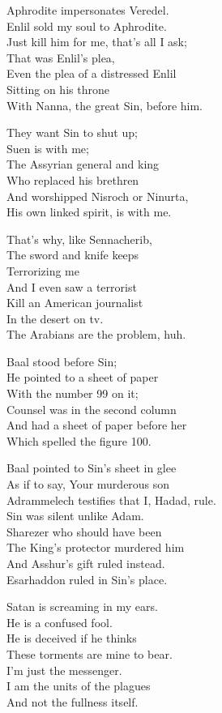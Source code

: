 \documentclass[
]{book}
\begin{document}
Aphrodite impersonates Veredel.\\
Enlil sold my soul to Aphrodite.\\
Just kill him for me, that's all I ask;\\
That was Enlil's plea,\\
Even the plea of a distressed Enlil\\
Sitting on his throne\\
With Nanna, the great Sin, before him.

They want Sin to shut up;\\
Suen is with me;\\
The Assyrian general and king\\
Who replaced his brethren\\
And worshipped Nisroch or Ninurta,\\
His own linked spirit, is with me.

That's why, like Sennacherib,\\
The sword and knife keeps\\
Terrorizing me\\
And I even saw a terrorist\\
Kill an American journalist\\
In the desert on tv.\\
The Arabians are the problem, huh.

Baal stood before Sin;\\
He pointed to a sheet of paper\\
With the number 99 on it;\\
Counsel was in the second column\\
And had a sheet of paper before her\\
Which spelled the figure 100.

Baal pointed to Sin's sheet in glee\\
As if to say, Your murderous son\\
Adrammelech testifies that I, Hadad, rule.\\
Sin was silent unlike Adam.\\
Sharezer who should have been\\
The King's protector murdered him\\
And Asshur's gift ruled instead.\\
Esarhaddon ruled in Sin's place.

Satan is screaming in my ears.\\
He is a confused fool.\\
He is deceived if he thinks\\
These torments are mine to bear.\\
I'm just the messenger.\\
I am the units of the plagues\\
And not the fullness itself.
\end{document}
